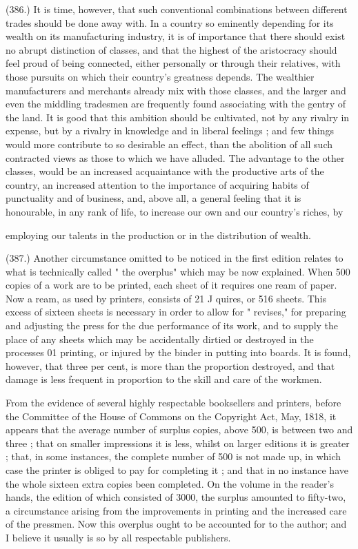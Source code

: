 \documentclass{article}
\begin{document}
(386.) It is time, however, that such conventional combinations between different trades should be done away with. In a country so eminently depending for its wealth on its manufacturing industry, it is of importance that there should exist no abrupt distinction of classes, and that the highest of the aristocracy should feel proud of being connected, either personally or through their relatives, with those pursuits on which their country's greatness depends. The wealthier manufacturers and merchants already mix with those classes, and the larger and even the middling tradesmen are frequently found associating with the gentry of the land. It is good that this ambition should be cultivated, not by any rivalry in expense, but by a rivalry in knowledge and in liberal feelings ; and few things would more contribute to so desirable an effect, than the abolition of all such contracted views as those to which we have alluded. The advantage to the other classes, would be an increased acquaintance with the productive arts of the country, an increased attention to the importance of acquiring habits of punctuality and of business, and, above all, a general feeling that it is honourable, in any rank of life, to increase our own and our country's riches, by


employing our talents in the production or in the distribution of wealth.


(387.) Another circumstance omitted to be noticed in the first edition relates to what is technically called " the overplus" which may be now explained. When 500 copies of a work are to be printed, each sheet of it requires one ream of paper. Now a ream, as used by printers, consists of 21 J quires, or 516 sheets. This excess of sixteen sheets is necessary in order to allow for " revises," for preparing and adjusting the press for the due performance of its work, and to supply the place of any sheets which may be accidentally dirtied or destroyed in the processes 01 printing, or injured by the binder in putting into boards. It is found, however, that three per cent, is more than the proportion destroyed, and that damage is less frequent in proportion to the skill and care of the workmen.


From the evidence of several highly respectable booksellers and printers, before the Committee of the House of Commons on the Copyright Act, May, 1818, it appears that the average number of surplus copies, above 500, is between two and three ; that on smaller impressions it is less, whilst on larger editions it is greater ; that, in some instances, the complete number of 500 is not made up, in which case the printer is obliged to pay for completing it ; and that in no instance have the whole sixteen extra copies been completed. On the volume in the reader's hands, the edition of which consisted of 3000, the surplus amounted to fifty-two, a circumstance arising from the improvements in printing and the increased care of the pressmen. Now this overplus ought to be accounted for to the author; and I believe it usually is so by all respectable publishers.
\end{document}
